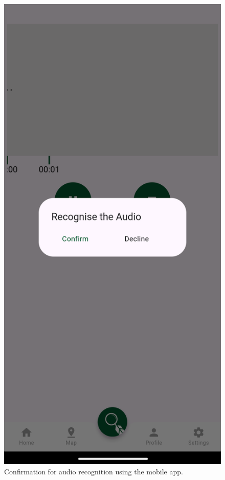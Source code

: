   \begin{figure}[h!]
      \centering
      \includegraphics[scale=0.26]{images/confirmation.png}
      \caption{Confirmation for audio recognition using the mobile app.}
  \end{figure}
